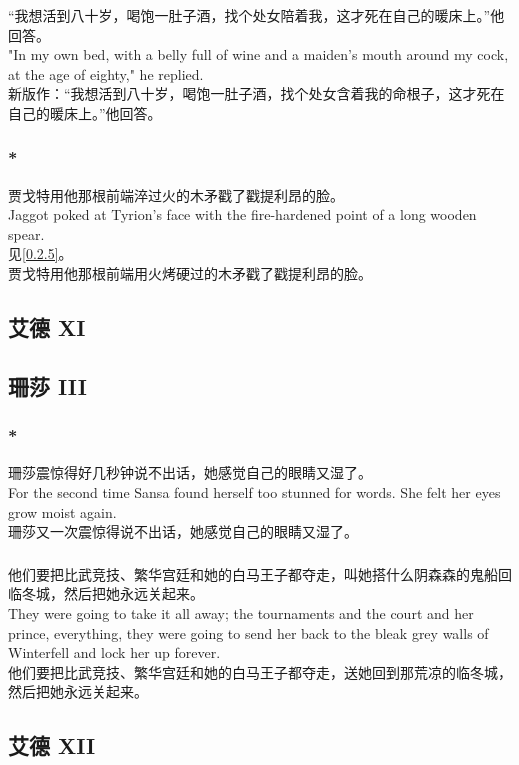 \documentclass[12pt,a4paper]{article}
\newcommand{\h}[1]{{\color{red}#1}\\}
\newcommand{\la}[1]{{\color{blue}#1}\\}
\begin{document}
\subsubsection{}\la{
	“我想活到八十岁，喝饱一肚子酒，找个处女陪着我，这才死在自己的暖床上。”他回答。\\
	"In my own bed, with a belly full of wine and a maiden's mouth around my cock, at the age of eighty," he replied.}
	新版作：“我想活到八十岁，喝饱一肚子酒，找个处女含着我的命根子，这才死在自己的暖床上。”他回答。
	
\subsubsection{\color{red}*}\la{
	 贾戈特用他那根前端淬过火的木矛戳了戳提利昂的脸。\\
	 Jaggot poked at Tyrion's face with the fire-hardened point of a long wooden spear.}\h{
	 见\ref{0.2.5}。}
	 贾戈特用他那根前端用火烤硬过的木矛戳了戳提利昂的脸。
								
\subsection{艾德 XI}

	
\subsection{珊莎 III}
\subsubsection{\color{red}*}\la{
	珊莎震惊得好几秒钟说不出话，她感觉自己的眼睛又湿了。\\
	For the second time Sansa found herself too stunned for words. She felt her eyes grow moist again.}
	珊莎又一次震惊得说不出话，她感觉自己的眼睛又湿了。
\subsubsection{}\la{
	他们要把比武竞技、繁华宫廷和她的白马王子都夺走，叫她搭什么阴森森的鬼船回临冬城，然后把她永远关起来。\\
	They were going to take it all away; the tournaments and the court and her prince, everything, they were going to send her back to the bleak grey walls of Winterfell and lock her up forever.}
	他们要把比武竞技、繁华宫廷和她的白马王子都夺走，送她回到那荒凉的临冬城，然后把她永远关起来。
		
\subsection{艾德 XII}
\end{document}
